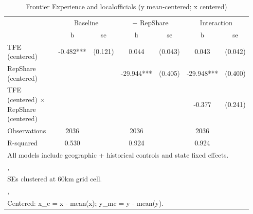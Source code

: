 \begin{table}[htbp]\centering
\def\sym#1{\ifmmode^{#1}\else\(^{#1}\)\fi}
\caption{Frontier Experience and localofficials (y mean-centered; x centered)}
\begin{tabular}{l*{3}{cc}}
\toprule
                &\multicolumn{2}{c}{Baseline}&\multicolumn{2}{c}{ + RepShare}&\multicolumn{2}{c}{Interaction}\\
                &        b   &       se&        b   &       se&        b   &       se\\
\midrule
TFE (centered)  &   -0.482***&  (0.121)&    0.044   &  (0.043)&    0.043   &  (0.042)\\
RepShare (centered)&            &         &  -29.944***&  (0.405)&  -29.948***&  (0.400)\\
TFE (centered) $\times$ RepShare (centered)&            &         &            &         &   -0.377   &  (0.241)\\
\midrule
Observations    &     2036   &         &     2036   &         &     2036   &         \\
R-squared       &    0.530   &         &    0.924   &         &    0.924   &         \\
\bottomrule
\multicolumn{7}{l}{\footnotesize All models include geographic + historical controls and state fixed effects.}\\
\multicolumn{7}{l}{\footnotesize ,}\\
\multicolumn{7}{l}{\footnotesize SEs clustered at 60km grid cell.}\\
\multicolumn{7}{l}{\footnotesize ,}\\
\multicolumn{7}{l}{\footnotesize Centered: x\_c = x - mean(x); y\_mc = y - mean(y).}\\
\end{tabular}
\end{table}
